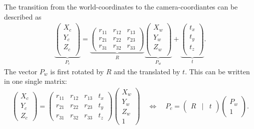 The transition from the world-coordinates to the camera-coordiantes can be described as 
\begin{align*}
\underbrace{\begin{pmatrix}
X_c\\
Y_c\\
Z_c\\
\end{pmatrix}}_{P_c}=
\underbrace{\begin{pmatrix}
r_{11}&r_{12}&r_{13}\\
r_{21}&r_{22}&r_{23}\\
r_{31}&r_{32}&r_{33}
\end{pmatrix}}_{R}
\underbrace{\begin{pmatrix}
X_w\\
Y_w\\
Z_w\\
\end{pmatrix}}_{P_w}+
\underbrace{\begin{pmatrix}
t_x\\
t_y\\
t_z\\
\end{pmatrix}}_{t}.
\end{align*}
The vector $P_w$ is first rotated by $R$ and the translated by $t$. This can be written in one single matrix:
\begin{align}
\begin{pmatrix}
X_c\\
Y_c\\
Z_c
\end{pmatrix}=
\begin{pmatrix}
r_{11}&r_{12}&r_{13}&t_x\\
r_{21}&r_{22}&r_{23}&t_y\\
r_{31}&r_{32}&r_{33}&t_z
\end{pmatrix}
\begin{pmatrix}
X_w\\
Y_w\\
Z_w\\
1
\end{pmatrix}\quad\Leftrightarrow\quad
P_c=
\begin{pmatrix}
R&|&t
\end{pmatrix}
\begin{pmatrix}
P_w\\
1
\end{pmatrix}\label{theory:world-camera}.
\end{align}

